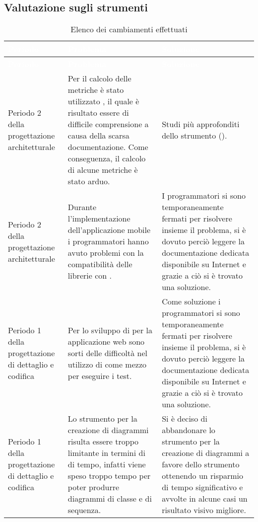 \subsection{Valutazione sugli strumenti}

{
	\renewcommand{\arraystretch}{1.5}
	\centering
	\begin{longtable}{ C{3cm} C{5.5cm} C{5.5cm}}
		\caption{Elenco dei cambiamenti effettuati}\\
		\textcolor{white}{\textbf{Periodo}} & \textcolor{white}{\textbf{Problema}} & \textcolor{white}{\textbf{Soluzione}}\\
		\endfirsthead
		\textcolor{white}{\textbf{Periodo}} & \textcolor{white}{\textbf{Problema}} & \textcolor{white}{\textbf{Soluzione}}\\
		\endhead
	
	Periodo 2 della progettazione architetturale & Per il calcolo delle metriche è stato utilizzato , il quale è risultato essere di difficile comprensione a causa della scarsa documentazione. Come conseguenza, il calcolo di alcune metriche è stato arduo. &  Studi più approfonditi dello strumento ().\\
	
	Periodo 2 della progettazione architetturale & Durante l'implementazione dell'applicazione mobile i programmatori hanno avuto problemi con la compatibilità delle librerie con . & I programmatori si sono temporaneamente fermati per risolvere insieme il problema, si è dovuto perciò leggere la documentazione dedicata disponibile su Internet e grazie a ciò si è trovato una soluzione.\\
	
	Periodo 1 della progettazione di dettaglio e codifica & Per lo sviluppo di  per la applicazione web sono sorti delle difficoltà nel utilizzo di  come mezzo per eseguire i test. & Come soluzione i programmatori si sono temporaneamente fermati per risolvere insieme il problema, si è dovuto perciò leggere la documentazione dedicata disponibile su Internet e grazie a ciò si è trovato una soluzione.\\
	
	Periodo 1 della progettazione di dettaglio e codifica& Lo strumento per la creazione di diagrammi  risulta essere troppo limitante in termini di di tempo, infatti viene speso troppo tempo per poter produrre diagrammi di classe e di sequenza. & Si è deciso di abbandonare lo strumento per la creazione di diagrammi  a favore dello strumento  ottenendo un risparmio di tempo significativo e avvolte in alcune casi un risultato visivo migliore.\\
	

\end{longtable}}
